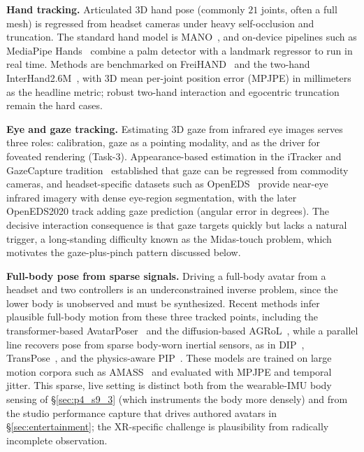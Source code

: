 \textbf{Hand tracking.} Articulated 3D hand pose (commonly $21$ joints, often a full mesh) is regressed from headset cameras under heavy self-occlusion and truncation. 
The standard hand model is MANO~\cite{romero2017mano}, and on-device pipelines such as MediaPipe Hands~\cite{zhang2020mediapipe} combine a palm detector with a landmark regressor to run in real time. 
Methods are benchmarked on FreiHAND~\cite{zimmermann2019freihand} and the two-hand InterHand2.6M~\cite{moon2020interhand2}, with 3D mean per-joint position error (MPJPE) in millimeters as the headline metric; robust two-hand interaction and egocentric truncation remain the hard cases.

\textbf{Eye and gaze tracking.} Estimating 3D gaze from infrared eye images serves three roles: calibration, gaze as a pointing modality, and as the driver for foveated rendering (Task-3). 
Appearance-based estimation in the iTracker and GazeCapture tradition~\cite{krafka2016gazecapture} established that gaze can be regressed from commodity cameras, and headset-specific datasets such as OpenEDS~\cite{garbin2019openeds} provide near-eye infrared imagery with dense eye-region segmentation, with the later OpenEDS2020 track adding gaze prediction (angular error in degrees). 
The decisive interaction consequence is that gaze targets quickly but lacks a natural trigger, a long-standing difficulty known as the Midas-touch problem, which motivates the gaze-plus-pinch pattern discussed below.

\textbf{Full-body pose from sparse signals.} Driving a full-body avatar from a headset and two controllers is an underconstrained inverse problem, since the lower body is unobserved and must be synthesized. 
Recent methods infer plausible full-body motion from these three tracked points, including the transformer-based AvatarPoser~\cite{jiang2022avatarposer} and the diffusion-based AGRoL~\cite{du2023agrol}, while a parallel line recovers pose from sparse body-worn inertial sensors, as in DIP~\cite{huang2018dip}, TransPose~\cite{yi2021transpose}, and the physics-aware PIP~\cite{yi2022pip}. 
These models are trained on large motion corpora such as AMASS~\cite{mahmood2019amass} and evaluated with MPJPE and temporal jitter. 
This sparse, live setting is distinct both from the wearable-IMU body sensing of §\ref{sec:p4_s9_3} (which instruments the body more densely) and from the studio performance capture that drives authored avatars in §\ref{sec:entertainment}; the XR-specific challenge is plausibility from radically incomplete observation.

